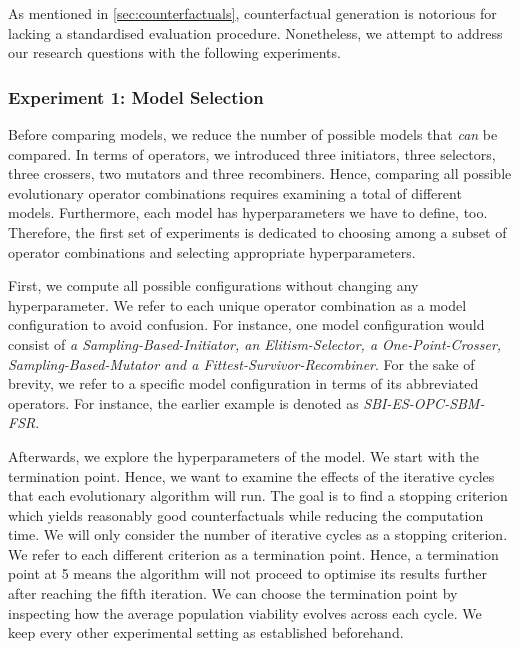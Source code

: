 \documentclass[./../../paper.tex]{subfiles}
\begin{document}
As mentioned in \autoref{sec:counterfactuals}, counterfactual generation is notorious for lacking a standardised evaluation procedure. Nonetheless, we attempt to address our research questions with the following experiments.

\subsubsection{Experiment 1: Model Selection}
Before comparing models, we reduce the number of possible models that \emph{can} be compared. In terms of operators, we introduced three initiators, three selectors, three crossers, two mutators and three recombiners. Hence, comparing all possible evolutionary operator combinations requires examining a total of \NumEvoCombinations different models. Furthermore, each model has hyperparameters we have to define, too. Therefore, the first set of experiments is dedicated to choosing among a subset of operator combinations and selecting appropriate hyperparameters. 

First, we compute all possible configurations without changing any hyperparameter. We refer to each unique operator combination as a model configuration to avoid confusion. For instance, one model configuration would consist of \emph{a Sampling-Based-Initiator, an Elitism-Selector, a One-Point-Crosser, Sampling-Based-Mutator and a Fittest-Survivor-Recombiner}. For the sake of brevity, we refer to a specific model configuration in terms of its abbreviated operators. For instance, the earlier example is denoted as \emph{SBI-ES-OPC-SBM-FSR}.

Afterwards, we explore the hyperparameters of the model. We start with the termination point. Hence, we want to examine the effects of the iterative cycles that each evolutionary algorithm will run. The goal is to find a stopping criterion which yields reasonably good counterfactuals while reducing the computation time. We will only consider the number of iterative cycles as a stopping criterion. We refer to each different criterion as a termination point. Hence, a termination point at 5 means the algorithm will not proceed to optimise its results further after reaching the fifth iteration. We can choose the termination point by inspecting how the average population viability evolves across each cycle. We keep every other experimental setting as established beforehand.
\end{document}
